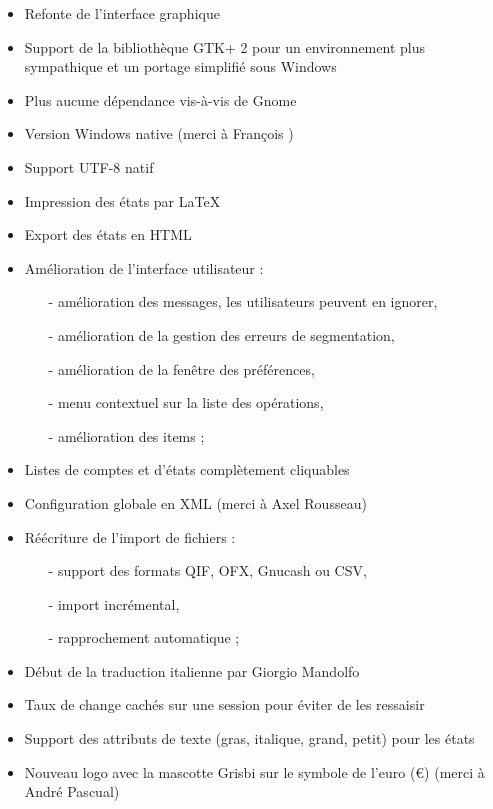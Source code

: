 \begin{itemize}
	\item Refonte de l'interface graphique
	\item Support de la bibliothèque \gls{GTK}+ 2 pour un environnement plus sympathique et un portage simplifié sous Windows
	\item Plus aucune dépendance vis-à-vis de \gls{Gnome}
	\item Version Windows native (merci à François %
	)
	\item Support \gls{UTF-8} natif
	\item Impression des états par \gls{LaTeX}
	\item Export des états en \gls{HTML}
	\item Amélioration de l'interface utilisateur :
		\begin{itemize}
		\item[-] amélioration des messages, les utilisateurs peuvent en ignorer,
		\item[-] amélioration de la gestion des erreurs de segmentation,
		\item[-] amélioration de la fenêtre des préférences,
		\item[-] menu contextuel sur la liste des opérations,
		\item[-] amélioration des items ;
		\end{itemize}
	\item Listes de comptes et d'états complètement cliquables
	\item Configuration globale en \gls{XML} (merci à Axel Rousseau)
	\item Réécriture de l'import de fichiers :
		\begin{itemize}
		\item[-] support des formats \gls{QIF}, \gls{OFX}, \gls{Gnucash} ou \gls{CSV},
		\item[-] import incrémental,
		\item[-] rapprochement automatique ;
		\end{itemize}
	\item Début de la traduction italienne par Giorgio Mandolfo
	\item Taux de change cachés sur une session pour éviter de les
	ressaisir
	\item Support des attributs de texte (gras, italique, grand, petit) pour les états
	\item Nouveau logo avec la mascotte Grisbi sur le symbole de l'euro (€) (merci à André Pascual)

\end{itemize}
